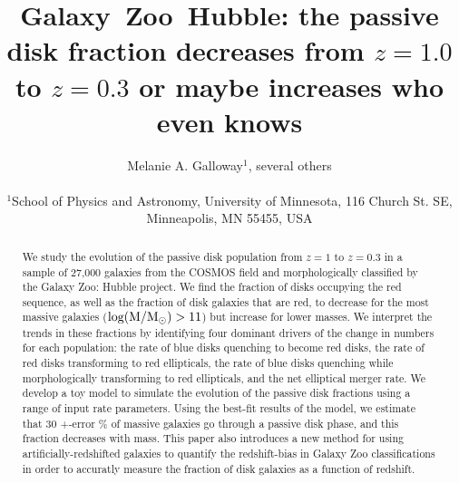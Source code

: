 \documentclass[useAMS,usenatbib]{mn2e}
\begin{document}
\title[Galaxy~Zoo: passive disk fraction]{Galaxy~Zoo~Hubble: the passive disk fraction decreases from $z=1.0$ to $z=0.3$ or maybe increases who even knows}
\author[Galloway et~al.]{\parbox[t]{16cm}{Melanie A. Galloway$^1$, several others
\vspace{0.1in} }\\
$^{1}$School of Physics and Astronomy, University of Minnesota, 116 Church St. SE, Minneapolis, MN 55455, USA\\
   }
\maketitle

\begin{abstract}
We study the evolution of the passive disk population from $z=1$ to $z=0.3$ in a sample of 27,000 galaxies from the COSMOS field and morphologically classified by the Galaxy Zoo: Hubble project. We find the fraction of disks occupying the red sequence, as well as the fraction of disk galaxies that are red, to decrease for the most massive galaxies ($\rm log(M/M_{\odot})>11$) but increase for lower masses. We interpret the trends in these fractions by identifying four dominant drivers of the change in numbers for each population: the rate of blue disks quenching to become red disks, the rate of red disks transforming to red ellipticals, the rate of blue disks quenching while morphologically transforming to red ellipticals, and the net elliptical merger rate. We develop a toy model to simulate the evolution of the passive disk fractions using a range of input rate parameters. Using the best-fit results of the model, we estimate that 30 +-error \% of massive galaxies go through a passive disk phase, and this fraction decreases with mass. This paper also introduces a new method for using artificially-redshifted galaxies to quantify the redshift-bias in Galaxy Zoo classifications in order to accuratly measure the fraction of disk galaxies as a function of redshift.  

\end{abstract}
\end{document}
